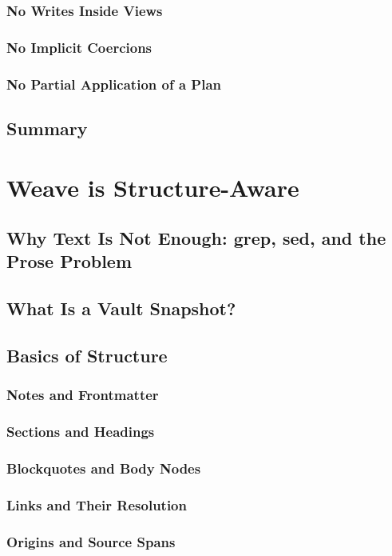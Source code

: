\documentclass[nohyper,nobib]{tufte-book}
\begin{document}
\subsection{No Writes Inside Views}
\subsection{No Implicit Coercions}
\subsection{No Partial Application of a Plan}
\section{Summary}

\chapter{Weave is Structure-Aware}
\section{Why Text Is Not Enough: grep, sed, and the Prose Problem}
\section{What Is a Vault Snapshot?}
\section{Basics of Structure}
\subsection{Notes and Frontmatter}
\subsection{Sections and Headings}
\subsection{Blockquotes and Body Nodes}
\subsection{Links and Their Resolution}
\subsection{Origins and Source Spans}
\end{document}
